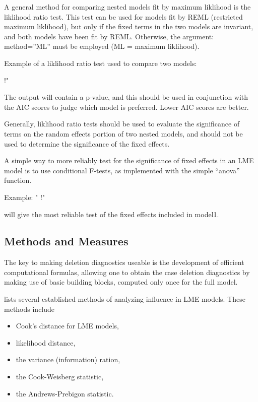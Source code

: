 \documentclass[Chap5amain.tex]{subfiles}
\begin{document}
A general method for comparing nested models fit by maximum liklihood is the liklihood ratio 
test. This test can be used for models fit by REML (restricted maximum liklihood), but only if the 
fixed terms in the two models are invariant, and both models have been fit by REML. Otherwise, 
the argument: method=”ML” must be employed (ML = maximum liklihood). 

Example of a liklihood ratio test used to compare two models: 

!"%

The output will contain a p-value, and this should be used in conjunction with the AIC scores to 
judge which model is preferred. Lower AIC scores are better. 

Generally, liklihood ratio tests should be used to evaluate the significance of terms on the 
random effects portion of two nested models, and should not be used to determine the 
significance of the fixed effects. 

A simple way to more reliably test for the significance of fixed effects in an LME model is to use 
conditional F-tests, as implemented with the simple “anova” function. 

Example: 
"
!"%

will give the most reliable test of the fixed effects included in model1. 





\subsection{Methods and Measures}
The key to making deletion diagnostics useable is the development of efficient computational formulas, allowing one to obtain the  case deletion diagnostics by making use of basic building blocks, computed only once for the full model.


\citet{Zewotir} lists several established methods of analyzing influence in LME models. These methods include \begin{itemize}
	\item Cook's distance for LME models,
	\item {} likelihood distance,
	\item the variance (information) ration,
	\item the  Cook-Weisberg statistic,
	\item the  Andrews-Prebigon statistic.
\end{itemize}
\end{document}
